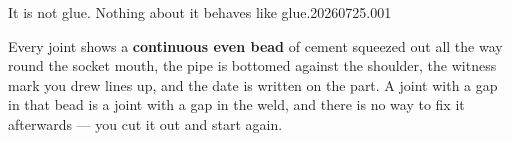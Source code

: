


  {It is not glue. Nothing about it behaves like glue.}{20260725.001}



\begin{standard}
Every joint shows a \textbf{continuous even bead} of cement squeezed out all the
way round the socket mouth, the pipe is bottomed against the shoulder, the
witness mark you drew lines up, and the date is written on the part. A joint
with a gap in that bead is a joint with a gap in the weld, and there is no way
to fix it afterwards --- you cut it out and start again.
\end{standard}

